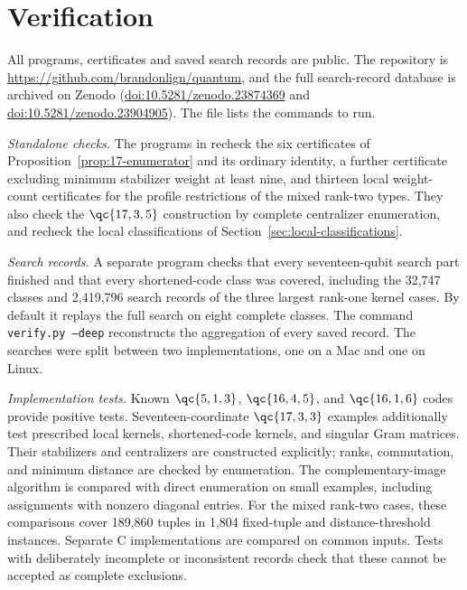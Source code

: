 \section{Verification}\label{sec:verification}

All programs, certificates and saved search records are public. The
repository is \url{https://github.com/brandonlign/quantum}, and the
full search-record database is archived on Zenodo
(\href{https://doi.org/10.5281/zenodo.23874369}{doi:10.5281/zenodo.23874369}
and \href{https://doi.org/10.5281/zenodo.23904905}{doi:10.5281/zenodo.23904905}).
The file  lists the commands to run.

\emph{Standalone checks.} The programs in 
recheck the six certificates of Proposition~\ref{prop:17-enumerator}
and its ordinary identity, a further certificate excluding minimum
stabilizer weight at least nine, and thirteen local weight-count
certificates for the profile restrictions of the mixed rank-two types.
They also check the \(\qc{17,3,5}\) construction by complete
centralizer enumeration, and recheck the local classifications of
Section~\ref{sec:local-classifications}.

\emph{Search records.} A separate program checks that every
seventeen-qubit search part finished and that every shortened-code class
was covered, including the 32,747 classes and 2,419,796 search records of
the three largest rank-one kernel cases. By default it replays the full
search on eight complete classes. The command
{\small\texttt{verify.py --{}deep}} reconstructs the aggregation of every saved
record. The searches were split between two implementations, one on a
Mac and one on Linux.

\emph{Implementation tests.} Known \(\qc{5,1,3}\), \(\qc{16,4,5}\),
and \(\qc{16,1,6}\) codes provide positive tests.
Seventeen-coordinate \(\qc{17,3,3}\) examples additionally test
prescribed local kernels, shortened-code kernels, and singular Gram
matrices. Their stabilizers and centralizers are constructed explicitly;
ranks, commutation, and minimum distance are checked by enumeration.
The complementary-image algorithm is compared with direct enumeration
on small examples, including assignments with nonzero diagonal entries.
For the mixed rank-two cases, these comparisons cover 189,860 tuples
in 1,804 fixed-tuple and distance-threshold instances. Separate C
implementations are compared on common inputs. Tests with deliberately
incomplete or inconsistent records check that these cannot be accepted
as complete exclusions.
